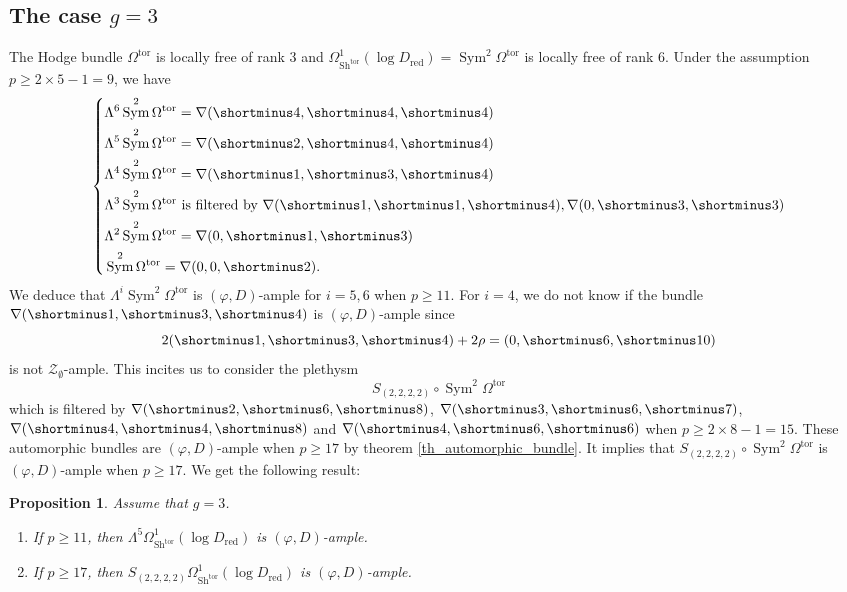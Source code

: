\documentclass[11pt]{amsart}
\numberwithin{subsection}{section}
\numberwithin{figure}{section}
\numberwithin{table}{section}
\theoremstyle{1}
\newtheorem{proposition}[theorem]{Proposition}
\theoremstyle{2}
\DeclareMathOperator{\Sh}{Sh}
\DeclareMathOperator{\Sym}{Sym}
\DeclareMathOperator{\tor}{tor}
\DeclareMathOperator{\red}{red}
\begin{document}
\subsection{The case $g = 3$}\label{ex_pleth_g3}
The Hodge bundle $\Omega^{\tor}$ is locally free of rank $3$ and $\Omega^1_{\Sh^{\tor}}(\log D_{\red}) = \Sym^2 \Omega^{\tor}$ is locally free of rank $6$. Under the assumption $p \geq 2 \times 5-1 = 9$, we have
\begin{equation*}
\left\{
\begin{aligned}
&\Lambda^{6}\Sym^2 \Omega^{\tor} = \nabla(\shortminus4,\shortminus4,\shortminus4) \\
&\Lambda^{5}\Sym^2 \Omega^{\tor} = \nabla(\shortminus2,\shortminus4,\shortminus4) \\
&\Lambda^{4}\Sym^2 \Omega^{\tor}  = \nabla(\shortminus1,\shortminus3,\shortminus4) \\
&\Lambda^{3}\Sym^2 \Omega^{\tor} \text{ is filtered by } \nabla(\shortminus1,\shortminus1,\shortminus4), \nabla(0,\shortminus3,\shortminus3) \\
&\Lambda^{2}\Sym^2 \Omega^{\tor}  = \nabla(0,\shortminus1,\shortminus3) \\
&\Sym^2 \Omega^{\tor}  = \nabla(0,0,\shortminus2) .
\end{aligned}
\right.
\end{equation*}
We deduce that $\Lambda^{i}\Sym^2 \Omega^{\tor}$ is $(\varphi,D)$-ample for $i = 5,6$ when $p \geq 11$. For $i = 4$, we do not know if the bundle $\nabla(\shortminus1,\shortminus3,\shortminus4)$ is $(\varphi,D)$-ample since
\begin{equation*}
2(\shortminus1,\shortminus3,\shortminus4) + 2\rho = (0,\shortminus6,\shortminus10)
\end{equation*}
is not $\mathcal{Z}_{\emptyset}$-ample. This incites us to consider the plethysm
\begin{equation*}
S_{(2,2,2,2)} \circ \Sym^2 \Omega^{\tor}
\end{equation*}
which is filtered by $\nabla(\shortminus2,\shortminus6,\shortminus8)$, $\nabla(\shortminus3,\shortminus6,\shortminus7)$, $\nabla(\shortminus4,\shortminus4,\shortminus8)$ and $\nabla(\shortminus4,\shortminus6,\shortminus6)$ when $p \geq 2\times 8 -1 = 15$. These automorphic bundles are $(\varphi,D)$-ample when $p \geq 17$ by theorem \ref{th_automorphic_bundle}. It implies that $S_{(2,2,2,2)} \circ \Sym^2 \Omega^{\tor}$ is $(\varphi,D)$-ample when $p \geq 17$. We get the following result:
\begin{proposition}
Assume that $g = 3$. 
\begin{enumerate}
\item If $p\geq 11$, then $\Lambda^{5}\Omega^1_{\Sh^{\tor}}(\log D_{\red})$ is $(\varphi,D)$-ample. 
\item If $p \geq 17$, then $S_{(2,2,2,2)}\Omega^1_{\Sh^{\tor}}(\log D_{\red})$ is $(\varphi,D)$-ample. 
\end{enumerate}
\end{proposition}
\end{document}
